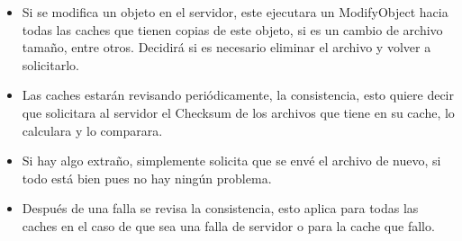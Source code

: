\begin{itemize}
\item Si se modifica un objeto en el servidor, este ejecutara un ModifyObject hacia todas las caches que tienen copias de este objeto, si es un cambio de archivo tamaño, entre otros. Decidirá si es necesario eliminar el archivo y volver a solicitarlo.
\item Las caches estarán revisando periódicamente, la consistencia, esto quiere decir que solicitara al servidor el Checksum de los archivos que tiene en su cache, lo calculara y lo comparara.
\item Si hay algo extraño, simplemente solicita que se envé el archivo de nuevo, si todo está bien pues no hay ningún problema.
\item Después de una falla se revisa la consistencia, esto aplica para todas las caches en el caso de que sea una falla de servidor o para la cache que fallo.
\end{itemize}